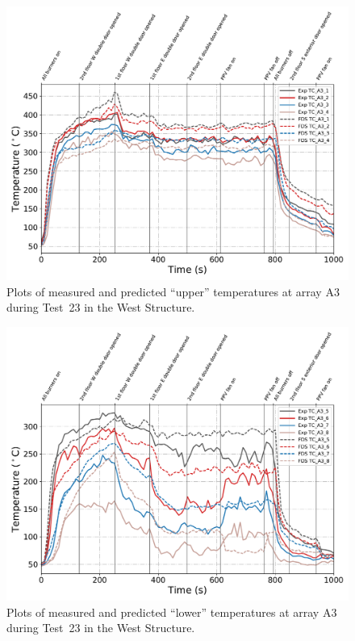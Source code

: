 \begin{figure}[!h]
	\centering
	\includegraphics[width=\columnwidth]{Figures/Plots/Validation/Temperature/Test_23_TC_A3_upper}
	\caption{Plots of measured and predicted ``upper'' temperatures at array A3 during Test~23 in the West Structure.}
	\label{fig:TCA3_upper_data_Test23}
\end{figure}

\begin{figure}[!h]
	\centering
	\includegraphics[width=\columnwidth]{Figures/Plots/Validation/Temperature/Test_23_TC_A3_lower}
	\caption{Plots of measured and predicted ``lower'' temperatures at array A3 during Test~23 in the West Structure.}
	\label{fig:TCA3_lower_data_Test23}
\end{figure}

